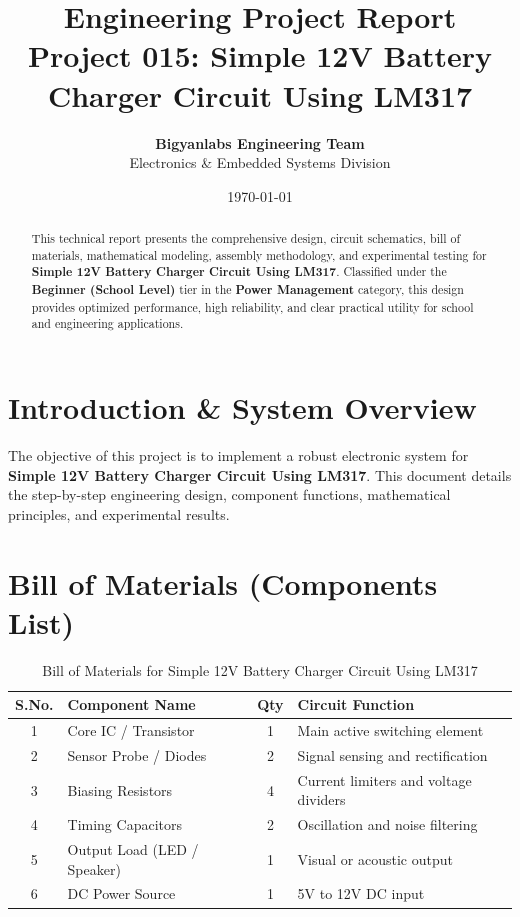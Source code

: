 \documentclass[11pt,a4paper]{article}
\title{\textbf{\Huge Engineering Project Report}\\[0.5em] \Large Project 015: Simple 12V Battery Charger Circuit Using LM317}
\author{\textbf{Bigyanlabs Engineering Team}\\ Electronics \& Embedded Systems Division}
\date{\today}
\begin{document}
\maketitle
\thispagestyle{empty}

\begin{abstract}
This technical report presents the comprehensive design, circuit schematics, bill of materials, mathematical modeling, assembly methodology, and experimental testing for \textbf{Simple 12V Battery Charger Circuit Using LM317}. Classified under the \textbf{Beginner (School Level)} tier in the \textbf{Power Management} category, this design provides optimized performance, high reliability, and clear practical utility for school and engineering applications.
\end{abstract}

\newpage
\tableofcontents
\newpage

\section{Introduction \& System Overview}
The objective of this project is to implement a robust electronic system for \textbf{Simple 12V Battery Charger Circuit Using LM317}. This document details the step-by-step engineering design, component functions, mathematical principles, and experimental results.

\section{Bill of Materials (Components List)}
\begin{table}[h!]
\centering
\caption{Bill of Materials for Simple 12V Battery Charger Circuit Using LM317}
\vspace{0.5em}
\begin{tabular}{clcp{7cm}}
\toprule
\textbf{S.No.} & \textbf{Component Name} & \textbf{Qty} & \textbf{Circuit Function} \\
\midrule
1 & Core IC / Transistor & 1 & Main active switching element \\
2 & Sensor Probe / Diodes & 2 & Signal sensing and rectification \\
3 & Biasing Resistors & 4 & Current limiters and voltage dividers \\
4 & Timing Capacitors & 2 & Oscillation and noise filtering \\
5 & Output Load (LED / Speaker) & 1 & Visual or acoustic output \\
6 & DC Power Source & 1 & 5V to 12V DC input \\
\bottomrule
\end{tabular}
\end{table}
\end{document}
